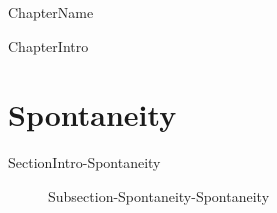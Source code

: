 \documentclass[main.tex]{subfiles}
\newcommand\chapterlabel{Ch-thermo}\setcounter{figurenewcounter}{0}\setcounter{tablenewcounter}{0}\setcounter{formulanewcounter}{0}\chapterpicture{../{\chapterlabel}/figure1}\chapterpicturelabel{PxFuel}
\begin{document}
  
 {ChapterName} 




  {ChapterIntro}



\section{Spontaneity}
{SectionIntro-Spontaneity}
\sloppy\begin{description}
\item[] {Subsection-Spontaneity-Spontaneity}
\end{description}
\end{document}
